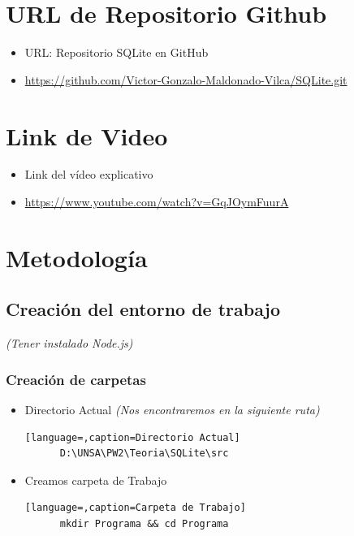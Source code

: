 \documentclass{article}
\begin{document}

  \section{URL de Repositorio Github}
  \begin{itemize}
    \item URL: Repositorio SQLite en GitHub
    \item \url{https://github.com/Victor-Gonzalo-Maldonado-Vilca/SQLite.git}
  \end{itemize}
  \newpage
  

	\section{Link de Video}
  \begin{itemize}
    \item Link del vídeo explicativo
    \item \url{https://www.youtube.com/watch?v=GqJOymFuurA}
  \end{itemize}


  \section{Metodología}


  \subsection{Creación del entorno de trabajo}
  \textit{(Tener instalado Node.js)}
  
  
  \subsubsection{Creación de carpetas}
  \begin{itemize}
    \item Directorio Actual \textit{(Nos encontraremos en la siguiente ruta)}
    \begin{lstlisting}[language=,caption=Directorio Actual]
      D:\UNSA\PW2\Teoria\SQLite\src
    \end{lstlisting}
    \item Creamos carpeta de Trabajo
    \begin{lstlisting}[language=,caption=Carpeta de Trabajo]
      mkdir Programa && cd Programa
    \end{lstlisting}
  \end{itemize}
\end{document}
